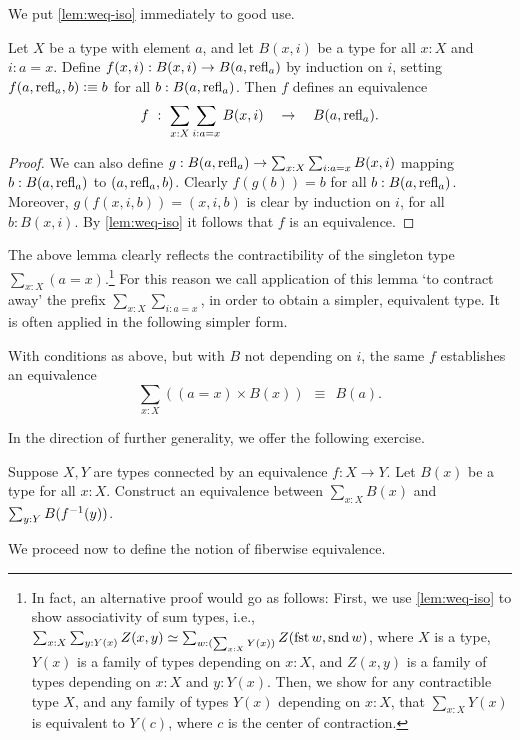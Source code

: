 We put \cref{lem:weq-iso} immediately to good use.

\begin{lemma}\label{lem:contract-away}
Let $X$ be a type with element $a$, and let
$B(x,i)$ be a type for all $x:X$ and $i: a=x$.
Define $f(x,i): B(x,i) \to B(a,\mathrm{refl}_{a})$ by induction on $i$,
setting $f(a,\refl{a},b) \defeq b$ for all $b:B(a,\mathrm{refl}_{a})$.
Then $f$ defines an equivalence
\[
f~:~ \sum_{x:X} \sum_{i: a=x} B(x,i) \quad \to \quad B(a,\mathrm{refl}_{a}).
\]
\end{lemma}
\begin{proof}
We can also define
$g: B(a,\mathrm{refl}_{a})\to \sum_{x:X} \sum_{i: a=x} B(x,i)$
mapping $b: B(a,\mathrm{refl}_{a})$ to $(a,\mathrm{refl}_{a},b)$.
Clearly $f(g(b))=b$ for all $b:B(a,\mathrm{refl}_{a})$.
Moreover, $g(f(x,i,b))=(x,i,b)$ is clear by induction
on $i$, for all $b:B(x,i)$.
By \cref{lem:weq-iso} it follows that $f$
is an equivalence.
\end{proof}

The above lemma clearly reflects the  contractibility of the
singleton type $\sum_{x:X}(a=x)$.\footnote{%
  In fact, an alternative proof would go as follows:
  First, we use \cref{lem:weq-iso} to show associativity of sum types,
  i.e., $\sum_{x:X}\sum_{y:Y(x)}Z(x,y)
  \equiv \sum_{w : (\sum_{x:X}Y(x))}Z(\fst w,\snd w)$,
  where $X$ is a type,
  $Y(x)$ is a family of types depending on $x:X$,
  and $Z(x,y)$ is a family of types depending on $x:X$ and $y:Y(x)$.
  Then, we show for any contractible type $X$,
  and any family of types $Y(x)$ depending on $x:X$,
  that $\sum_{x:X}Y(x)$ is equivalent to $Y(c)$,
  where $c$ is the center of contraction.}
For this reason
we call application of this lemma `to contract away'
the prefix $\sum_{x:X} \sum_{i: a=x}$, in order
to obtain a simpler, equivalent type. It is often applied
in the following simpler form.

\begin{corollary}\label{cor:contract-away}
With conditions as above, but with $B$ not depending on $i$, the same $f$
establishes an equivalence
\[
 \sum_{x:X} ((a=x)\times B(x))~~\equiv~~B(a).
\]
\end{corollary}

In the direction of further generality, we offer the following exercise.
\begin{xca}\label{xca:sum-equiv-base}
  Suppose $X,Y$ are types connected by an equivalence $f : X \to Y$.
  Let $B(x)$ be a type for all $x:X$. Construct an equivalence between
  $\sum_{x:X}B(x)$ and $\sum_{y:Y}B(f^{-1}(y))$.
\end{xca}
We proceed now to define the notion of fiberwise equivalence.


